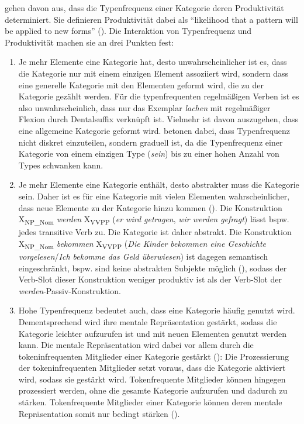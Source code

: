 \textcite[384]{Bybee.1997} gehen davon aus, dass die Typenfrequenz einer  Kategorie  deren Produktivität determiniert. Sie definieren Produktivität dabei als "`likelihood that a pattern will be applied to new forms"' (\cite[384]{Bybee.1997}). Die Interaktion von Typenfrequenz und Produktivität machen sie an drei Punkten fest:

\begin{enumerate}
\item Je mehr Elemente eine Kategorie hat, desto unwahrscheinlicher ist es, dass die Kategorie nur mit einem einzigen Element assoziiert wird, sondern dass eine generelle Kategorie mit den Elementen geformt wird, die zu der Kategorie gezählt werden. Für die typenfrequenten regelmäßigen Verben ist es also unwahrscheinlich, dass nur das Exemplar \textit{lachen} mit regelmäßiger Flexion durch Dentalsuffix verknüpft ist. Vielmehr ist davon auszugehen, dass eine allgemeine Kategorie geformt wird. \textcite[384]{Bybee.1997} betonen dabei, dass Typenfrequenz nicht diskret einzuteilen, sondern graduell ist, da die Typenfrequenz einer Kategorie von einem einzigen Type (\textit{sein}) bis zu einer hohen Anzahl von Types schwanken kann. 

\item Je mehr Elemente eine Kategorie enthält, desto abstrakter muss die Kategorie sein. Daher ist es für eine Kategorie mit vielen Elementen wahrscheinlicher, dass neue Elemente zu der Kategorie hinzu kommen (\cite[384]{Bybee.1997}). Die Konstruktion X\textsubscript{NP\_Nom} \textit{werden} X\textsubscript{VVPP} (\textit{er wird getragen}, \textit{wir werden gefragt}) lässt bspw. jedes transitive Verb zu. Die Kategorie ist daher abstrakt. Die Konstruktion X\textsubscript{NP\_Nom} \textit{bekommen} X\textsubscript{VVPP} (\textit{Die Kinder bekommen eine Geschichte vorgelesen}/\textit{Ich bekomme das Geld überwiesen}) ist dagegen semantisch eingeschränkt, bspw. sind keine abstrakten Subjekte möglich (\cite[133--134]{Wegener.1985}), sodass der Verb-Slot dieser Konstruktion weniger produktiv ist als der Verb-Slot der \textit{werden}-Passiv-Konstruktion.

\item Hohe Typenfrequenz bedeutet auch, dass eine Kategorie häufig genutzt wird. Dementsprechend wird ihre mentale Repräsentation gestärkt, sodass die Kategorie leichter aufzurufen ist und mit neuen Elementen genutzt werden kann. Die mentale Repräsentation wird dabei vor allem durch die tokeninfrequenten Mitglieder einer Kategorie gestärkt (\cite[62]{Bybee.2013}): Die Prozessierung der tokeninfrequenten Mitglieder setzt voraus, dass die Kategorie aktiviert wird, sodass sie gestärkt wird. Tokenfrequente Mitglieder können hingegen prozessiert werden, ohne die gesamte Kategorie aufzurufen und dadurch zu stärken. Tokenfrequente Mitglieder einer Kategorie können deren mentale Repräsentation somit nur bedingt stärken (\cite[62]{Bybee.2013}). 
\end{enumerate}

